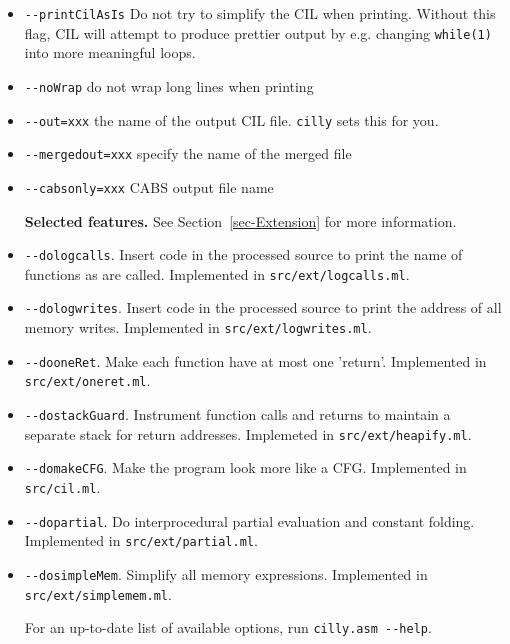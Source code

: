 \documentclass{article}
\def\secref#1{Section~\ref{sec-#1}}
\def\t#1{{\tt #1}}
\begin{document}
\begin{itemize}
  {\bf Output Options:}
  \item \t{-{}-printCilAsIs} Do not try to simplify the CIL when
  printing.  Without this flag, CIL will attempt to produce prettier
  output by e.g. changing \t{while(1)} into more meaningful loops.
  \item \t{-{}-noWrap} do not wrap long lines when printing
  \item \t{-{}-out=xxx} the name of the output CIL file.  \t{cilly}
  sets this for you.
  \item \t{-{}-mergedout=xxx} specify the name of the merged file
  \item \t{-{}-cabsonly=xxx} CABS output file name

  {\bf Selected features.}  See \secref{Extension} for more information.
\item \t{-{}-dologcalls}. Insert code in the processed source to print the name of
functions as are called. Implemented in \t{src/ext/logcalls.ml}.
\item \t{-{}-dologwrites}. Insert code in the processed source to print the
address of all memory writes. Implemented in \t{src/ext/logwrites.ml}.
\item \t{-{}-dooneRet}. Make each function have at most one 'return'.
Implemented in \t{src/ext/oneret.ml}. 
\item \t{-{}-dostackGuard}. Instrument function calls and returns to
maintain a separate stack for return addresses. Implemeted in
\t{src/ext/heapify.ml}. 
\item \t{-{}-domakeCFG}. Make the program look more like a CFG. Implemented
in \t{src/cil.ml}. 
\item \t{-{}-dopartial}. Do interprocedural partial evaluation and
constant folding. Implemented in \t{src/ext/partial.ml}. 
\item \t{-{}-dosimpleMem}. Simplify all memory expressions. Implemented in
\t{src/ext/simplemem.ml}. 

For an up-to-date list of available options, run \t{cilly.asm -{}-help}. 

\end{itemize}
\end{document}
